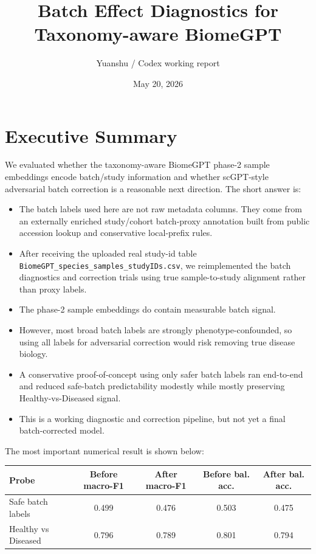 \documentclass[11pt]{article}
\title{\textbf{Batch Effect Diagnostics for Taxonomy-aware BiomeGPT}}
\author{Yuanshu / Codex working report}
\date{May 20, 2026}
\newcommand{\code}[1]{\texttt{\small #1}}
\begin{document}
\maketitle

\section*{Executive Summary}

We evaluated whether the taxonomy-aware BiomeGPT phase-2 sample embeddings encode
batch/study information and whether scGPT-style adversarial batch correction is a
reasonable next direction. The short answer is:

\begin{itemize}
  \item The batch labels used here are not raw metadata columns. They come from an
  externally enriched study/cohort batch-proxy annotation built from public accession
  lookup and conservative local-prefix rules.
  \item After receiving the uploaded real study-id table
  \code{BiomeGPT\_species\_samples\_studyIDs.csv}, we reimplemented the batch
  diagnostics and correction trials using true sample-to-study alignment rather than
  proxy labels.
  \item The phase-2 sample embeddings do contain measurable batch signal.
  \item However, most broad batch labels are strongly phenotype-confounded, so using all
  labels for adversarial correction would risk removing true disease biology.
  \item A conservative proof-of-concept using only safer batch labels ran end-to-end and
  reduced safe-batch predictability modestly while mostly preserving Healthy-vs-Diseased
  signal.
  \item This is a working diagnostic and correction pipeline, but not yet a final
  batch-corrected model.
\end{itemize}

The most important numerical result is shown below:

\begin{center}
\begin{tabular}{lcccc}
\toprule
Probe & Before macro-F1 & After macro-F1 & Before bal. acc. & After bal. acc. \\
\midrule
Safe batch labels & 0.499 & 0.476 & 0.503 & 0.475 \\
Healthy vs Diseased & 0.796 & 0.789 & 0.801 & 0.794 \\
\bottomrule
\end{tabular}
\end{center}
\end{document}
